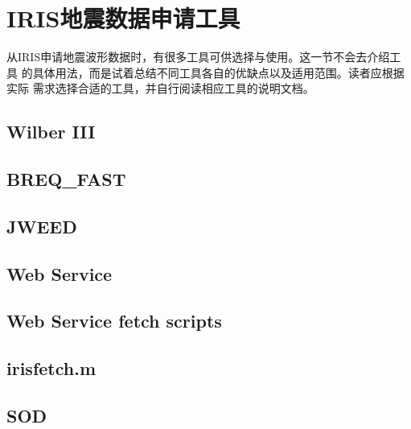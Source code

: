 \section{IRIS地震数据申请工具}
从IRIS申请地震波形数据时，有很多工具可供选择与使用。这一节不会去介绍工具
的具体用法，而是试着总结不同工具各自的优缺点以及适用范围。读者应根据实际
需求选择合适的工具，并自行阅读相应工具的说明文档。

\subsection{Wilber III}

\subsection{BREQ\_FAST}

\subsection{JWEED}

\subsection{Web Service}

\subsection{Web Service fetch scripts}

\subsection{irisfetch.m}

\subsection{SOD}
